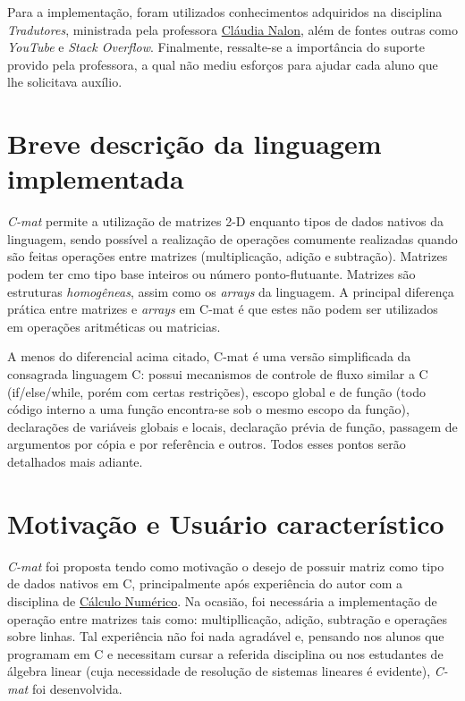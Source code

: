 \documentclass[
	article,			%
	11pt,				%
	oneside,			%
	a4paper,			%
	english,			%
	brazil,				%
	sumario=tradicional
	]{abntex2}
\renewcommand{\it}[1]{\textit{#1}}
\begin{document}
Para a implementação, foram utilizados conhecimentos adquiridos na disciplina \textit{Tradutores}, ministrada pela professora \hyperref{http://lattes.cnpq.br/7793795625581127}{}{}{Cláudia Nalon}, além de fontes outras como \it{YouTube} e \it{Stack Overflow}. Finalmente, ressalte-se a importância do suporte provido pela professora, a qual não mediu esforços para ajudar cada aluno que lhe solicitava auxílio.


\section{Breve descrição da linguagem implementada}

\it{C-mat} permite a utilização de matrizes 2-D enquanto tipos de dados nativos da linguagem, sendo possível a realização de operações comumente realizadas quando são feitas operações entre matrizes (multiplicação, adição e subtração). Matrizes podem ter cmo tipo base inteiros ou número ponto-flutuante. Matrizes são estruturas \it{homogêneas}, assim como os \it{arrays} da linguagem. A principal diferença prática entre matrizes e \it{arrays} em C-mat é que estes não podem ser utilizados em operações aritméticas ou matricias.

A menos do diferencial acima citado, C-mat é uma versão simplificada da consagrada linguagem C: possui mecanismos de controle de fluxo similar a C (if/else/while, porém com certas restrições), escopo global e de função (todo código interno a  uma função encontra-se sob o mesmo escopo da função), declarações de variáveis globais e locais, declaração prévia de função, passagem de argumentos por cópia e por referência e outros. Todos esses pontos serão detalhados mais adiante.

\section{Motivação e Usuário característico}
\it{C-mat} foi proposta tendo como motivação o desejo de possuir matriz como tipo de dados nativos em C, principalmente após experiência do autor com a disciplina de \href{https://matriculaweb.unb.br/graduacao/disciplina.aspx?cod=113417}{Cálculo Numérico}. Na ocasião, foi necessária a implementação de operação entre matrizes tais como: multipllicação, adição, subtração e operaçães sobre linhas. Tal experiência não foi nada agradável e, pensando nos alunos que programam em C e necessitam cursar a referida disciplina ou nos estudantes de álgebra linear (cuja necessidade de resolução de sistemas lineares é evidente), \it{C-mat} foi desenvolvida.
\end{document}
